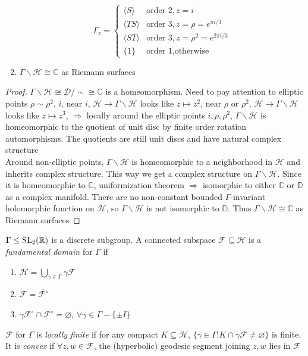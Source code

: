 \documentclass[main]{subfiles}
\begin{document}
\begin{theorem}
\begin{enumerate}
\[\overline\Gamma_z=\begin{cases}
\langle S\rangle&\text{order 2},z=i \\
\langle TS\rangle&\text{order 3},z=\rho=e^{\pi i/3} \\
\langle ST\rangle&\text{order 3},z=\rho^2=e^{2\pi i/3} \\
\{1\}&\text{order 1},\text{otherwise}
\end{cases}\]
\item $\Gamma\backslash\mathcal H\cong\mathbb C$ as Riemann surfaces
\end{enumerate}
\end{theorem}

\begin{proof}
$\Gamma\backslash\mathcal H\cong\mathcal D/\sim\cong\mathbb C$ is a homeomorphism. Need to pay attention to elliptic points $\rho\sim\rho^2$, $i$, near $i$, $\mathcal H\to\Gamma\backslash\mathcal H$ looks like $z\mapsto z^2$, near $\rho$ or $\rho^2$, $\mathcal H\to\Gamma\backslash\mathcal H$ looks like $z\mapsto z^3$, $\Rightarrow$ locally around the elliptic points $i,\rho,\rho^2$, $\Gamma\backslash\mathcal H$ is homeomorphic to the quotient of unit disc by finite order rotation automorphisms. The quotients are still unit discs and have natural complex structure \\
Around non-elliptic points, $\Gamma\backslash\mathcal H$ is homeomorphic to a neighborhood in $\mathcal H$ and inherits complex structure. This way we get a complex structure on $\Gamma\backslash\mathcal H$. Since it is homeomorphic to $\mathbb C$, uniformization theorem $\Rightarrow$ isomorphic to either $\mathbb C$ or $\mathbb D$ as a complex manifold. There are no non-constant bounded $\Gamma$-invariant holomorphic function on $\mathcal H$, so $\Gamma\backslash\mathcal H$ is not isomorphic to $\mathbb D$. Thus $\Gamma\backslash\mathcal H\cong\mathbb C$ as Riemann surfaces
\end{proof}

\begin{definition}
$\Gamma\leq\operatorname{SL}_2(\mathbb R)$ is a discrete subgroup. A connected subspace $\mathcal F\subseteq\mathcal H$ is a \textit{fundamental domain} for $\Gamma$ if
\begin{enumerate}
\item $\mathcal H=\bigcup_{\gamma\in\Gamma}\gamma \mathcal F$
\item $\mathcal F=\overline{\mathcal F^\circ}$
\item $\gamma \mathcal F^\circ\cap \mathcal F^\circ=\varnothing$, $\forall \gamma\in\Gamma-\{\pm I\}$
\end{enumerate}
$\mathcal F$ for $\Gamma$ is \textit{locally finite} if for any compact $K\subseteq\mathcal H$, $\{\gamma\in\Gamma|K\cap\gamma \mathcal F\neq\varnothing\}$ is finite. It is \textit{convex} if $\forall z,w\in \mathcal F$, the (hyperbolic) geodesic segment joining $z,w$ lies in $\mathcal F$
\end{definition}
\end{document}
